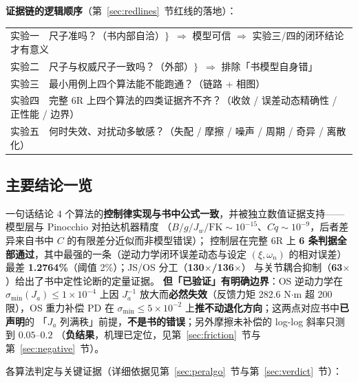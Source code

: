 \documentclass[11pt,a4paper]{ctexart}
\begin{document}
\textbf{证据链的逻辑顺序}（第~\ref{sec:redlines}~节红线的落地）：

\begin{center}
\small
\begin{tabular}{@{}l@{}}
实验一\ \ 尺子准吗？（书内部自洽）\hfill$\Bigg\}$\ $\Rightarrow$ 模型可信 $\Rightarrow$ 实验三/四的闭环结论才有意义 \\
实验二\ \ 尺子与权威尺子一致吗？（外部）\hfill$\Bigg\}$\ $\Rightarrow$ 排除「书模型自身错」 \\
实验三\ \ 最小用例上四个算法能不能跑通？（链路 + 相图） \\
实验四\ \ 完整 6R 上四个算法的四类证据齐不齐？（收敛 / 误差动态精确性 / 正性能 / 边界） \\
实验五\ \ 何时失效、对扰动多敏感？（失配 / 摩擦 / 噪声 / 周期 / 奇异 / 离散化） \\
\end{tabular}
\end{center}

\subsection{主要结论一览}

\begin{keybox}{一句话结论}
4 个算法的\textbf{控制律实现与书中公式一致}，并被独立数值证据支持——模型层与 Pinocchio 对拍达机器精度
（$B/g/J_w/\mathrm{FK}\sim10^{-15}$、$C\dot q\sim10^{-9}$，后者差异来自书中 $C$ 的有限差分近似而非模型错误）；
控制层在完整 6R 上 \textbf{6 条判据全部通过}，其中最强的一条（逆动力学闭环误差动态与设定
$(\xi,\omega_n)$ 的相对误差）最差 \textbf{1.2764\%}（阈值 2\%）；JS/OS 分工（\textbf{130$\times$/136$\times$}）
与关节耦合抑制（\textbf{63$\times$}）给出了书中定性论断的定量证据。
\textbf{但「已验证」有明确边界}：OS 逆动力学在 $\sigma_{\min}(J_a)\le1\times10^{-4}$ 上因 $J_a^{-1}$
放大而\textbf{必然失效}（反馈力矩 282.6 N$\cdot$m 超 200 限），OS 重力补偿 PD 在
$\sigma_{\min}\le5\times10^{-2}$ 上\textbf{推不动退化方向}；这两点对应书中\textbf{已声明}的
「$J_a$ 列满秩」前提，\textbf{不是书的错误}；另外摩擦未补偿的 log-log 斜率只测到 $0.05$--$0.2$
（\textbf{负结果}，机理已定位，见第~\ref{sec:friction}~节与第~\ref{sec:negative}~节）。
\end{keybox}

各算法判定与关键证据（详细依据见第~\ref{sec:peralgo}~节与第~\ref{sec:verdict}~节）：
\end{document}
